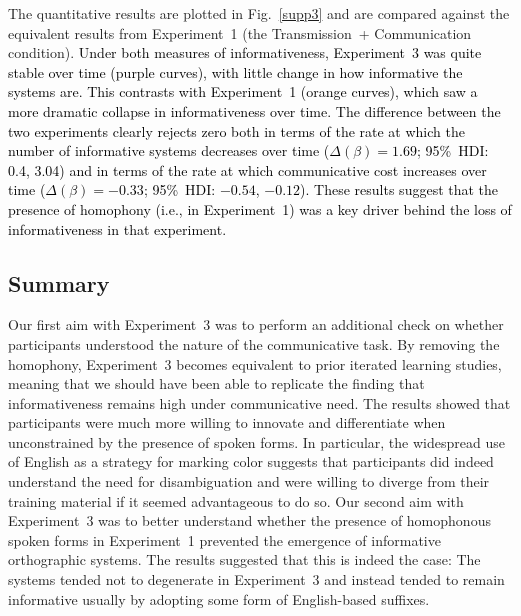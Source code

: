 \documentclass[doc,biblatex]{apa7}
\newcommand\secondrevision[1]{\textcolor{black}{#1}}
\begin{document}
The quantitative results are plotted in Fig.~\ref{supp3} and are compared against the equivalent results from Experiment~1 (the Transmission~+ Communication condition). \secondrevision{Under both measures of informativeness, Experiment~3 was quite stable over time (purple curves), with little change in how informative the systems are. This contrasts with Experiment~1 (orange curves), which saw a more dramatic collapse in informativeness over time. The difference between the two experiments clearly rejects zero both in terms of the rate at which the number of informative systems decreases over time ($\Delta(\beta) = 1.69$; 95\%~HDI: 0.4, 3.04) and in terms of the rate at which communicative cost increases over time ($\Delta(\beta) = -0.33$; 95\%~HDI: $-0.54$, $-0.12$). These results suggest that the presence of homophony (i.e., in Experiment~1) was a key driver behind the loss of informativeness in that experiment.}

\subsection{Summary}

Our first aim with Experiment~3 was to perform an additional check on whether participants understood the nature of the communicative task. By removing the homophony, Experiment~3 becomes equivalent to prior iterated learning studies, meaning that we should have been able to replicate the finding that informativeness remains high under communicative need. The results showed that participants were much more willing to innovate and differentiate when unconstrained by the presence of spoken forms. In particular, the widespread use of English as a strategy for marking color suggests that participants did indeed understand the need for disambiguation and were willing to diverge from their training material if it seemed advantageous to do so. Our second aim with Experiment~3 was to better understand whether the presence of homophonous spoken forms in Experiment~1 prevented the emergence of informative orthographic systems. The results suggested that this is indeed the case: The systems tended not to degenerate in Experiment~3 and instead tended to remain informative usually by adopting some form of English-based suffixes.
\end{document}
